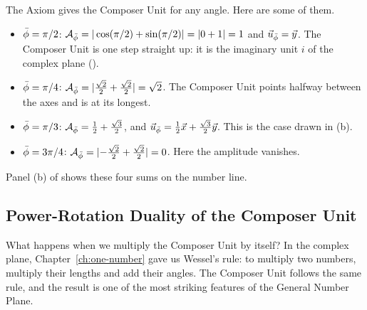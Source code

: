 \begin{workedexample}
The Axiom gives the Composer Unit for any angle. Here are some of them.
\begin{itemize}
  \item $\bar{\phi} = \pi/2$: $\mathcal{A}_{\bar{\phi}} = |\cos(\pi/2) + \sin(\pi/2)| = |0 + 1| = 1$ and $\vec{u}_{\bar{\phi}} = \vec{y}$. The Composer Unit is one step straight up: it is the imaginary unit $i$ of the complex plane ().
  \item $\bar{\phi} = \pi/4$: $\mathcal{A}_{\bar{\phi}} = |\tfrac{\sqrt{2}}{2} + \tfrac{\sqrt{2}}{2}| = \sqrt{2}$. The Composer Unit points halfway between the axes and is at its longest.
  \item $\bar{\phi} = \pi/3$: $\mathcal{A}_{\bar{\phi}} = \tfrac{1}{2} + \tfrac{\sqrt{3}}{2}$, and $\vec{u}_{\bar{\phi}} = \tfrac{1}{2}\vec{x} + \tfrac{\sqrt{3}}{2}\vec{y}$. This is the case drawn in (b).
  \item $\bar{\phi} = 3\pi/4$: $\mathcal{A}_{\bar{\phi}} = |{-\tfrac{\sqrt{2}}{2}} + \tfrac{\sqrt{2}}{2}| = 0$. Here the amplitude vanishes.
\end{itemize}
Panel (b) of  shows these four sums on the number line.
\end{workedexample}

\subsection{Power-Rotation Duality of the Composer Unit}\label{subsubsec:power-rotation}

What happens when we multiply the Composer Unit by itself? In the complex plane, Chapter~\ref{ch:one-number} gave us Wessel's rule: to multiply two numbers, multiply their lengths and add their angles. The Composer Unit follows the same rule, and the result is one of the most striking features of the General Number Plane.

